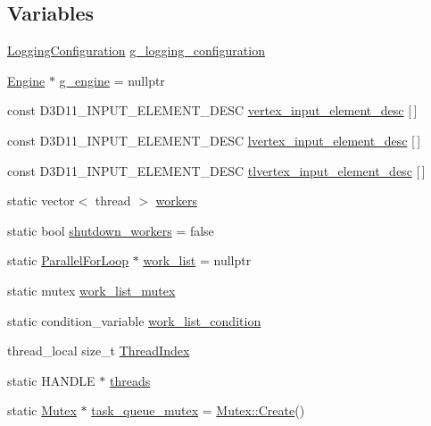 \subsection*{Variables}
\begin{DoxyCompactItemize}
\item 
\hyperlink{structmage_1_1_logging_configuration}{Logging\+Configuration} \hyperlink{namespacemage_a162413669f92d91c7ee135d60f93fcf1}{g\+\_\+logging\+\_\+configuration}
\item 
\hyperlink{classmage_1_1_engine}{Engine} $\ast$ \hyperlink{namespacemage_a84bf83f1e8779d884452cdf08f56c19a}{g\+\_\+engine} = nullptr
\item 
const D3\+D11\+\_\+\+I\+N\+P\+U\+T\+\_\+\+E\+L\+E\+M\+E\+N\+T\+\_\+\+D\+E\+SC \hyperlink{namespacemage_a8647e0bbbbe87e5c6d7a4d4622230119}{vertex\+\_\+input\+\_\+element\+\_\+desc} \mbox{[}$\,$\mbox{]}
\item 
const D3\+D11\+\_\+\+I\+N\+P\+U\+T\+\_\+\+E\+L\+E\+M\+E\+N\+T\+\_\+\+D\+E\+SC \hyperlink{namespacemage_ae6b56f20c8e8917ef1be8d9e4cef3ea3}{lvertex\+\_\+input\+\_\+element\+\_\+desc} \mbox{[}$\,$\mbox{]}
\item 
const D3\+D11\+\_\+\+I\+N\+P\+U\+T\+\_\+\+E\+L\+E\+M\+E\+N\+T\+\_\+\+D\+E\+SC \hyperlink{namespacemage_a0f27594da3814c163fe995326acf6c5e}{tlvertex\+\_\+input\+\_\+element\+\_\+desc} \mbox{[}$\,$\mbox{]}
\item 
static vector$<$ thread $>$ \hyperlink{namespacemage_ad2f58114b13692a9af3222fcd3b2ec2e}{workers}
\item 
static bool \hyperlink{namespacemage_a2342ab1ffdf94509ba4f9683189a1898}{shutdown\+\_\+workers} = false
\item 
static \hyperlink{classmage_1_1_parallel_for_loop}{Parallel\+For\+Loop} $\ast$ \hyperlink{namespacemage_a801b62787c07e98767a88f55154269a1}{work\+\_\+list} = nullptr
\item 
static mutex \hyperlink{namespacemage_a7e67d8a6b0029abe8f1480807f18b16a}{work\+\_\+list\+\_\+mutex}
\item 
static condition\+\_\+variable \hyperlink{namespacemage_a06c363811ca265ff89fbbe2b80e1e3d2}{work\+\_\+list\+\_\+condition}
\item 
thread\+\_\+local size\+\_\+t \hyperlink{namespacemage_aacfaaced796400d312a5d2cc43b5b09a}{Thread\+Index}
\item 
static H\+A\+N\+D\+LE $\ast$ \hyperlink{namespacemage_a15e9f7d36194ec1b768a82a2294cce6c}{threads}
\item 
static \hyperlink{classmage_1_1_mutex}{Mutex} $\ast$ \hyperlink{namespacemage_a7de4544ddddcf8e0d54dbfdc0778f13f}{task\+\_\+queue\+\_\+mutex} = \hyperlink{classmage_1_1_mutex_a48d784fa6bffd4088d9f89a2a9cca84e}{Mutex\+::\+Create}()

\end{DoxyCompactItemize}
